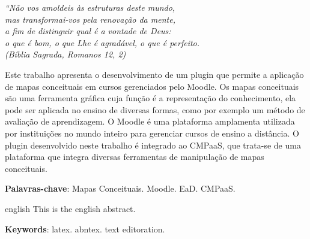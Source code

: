 \documentclass[
	12pt,				%
	openright,			%
	oneside,			%
	a4paper,			%
	english,			%
	french,				%
	spanish,			%
	brazil				%
	]{abntex2}
\begin{document}
\begin{agradecimentos}
\end{agradecimentos}

\begin{epigrafe}
     \vspace*{\fill}
 	\begin{flushright}
 		\textit{``Não vos amoldeis às estruturas deste mundo, \\
 		mas transformai-vos pela renovação da mente, \\
 		a fim de distinguir qual é a vontade de Deus: \\
 		o que é bom, o que Lhe é agradável, o que é perfeito.\\
 		(Bíblia Sagrada, Romanos 12, 2)}
 	\end{flushright}
 \end{epigrafe}


\setlength{\absparsep}{18pt} %
\begin{resumo}
 Este trabalho apresenta o desenvolvimento de um plugin que permite a aplicação de mapas conceituais em cursos gerenciados pelo Moodle. Os mapas conceituais são uma ferramenta gráfica cuja função é a representação do conhecimento, ela pode ser aplicada no ensino de diversas formas, como por exemplo um método de avaliação de aprendizagem. O Moodle é uma plataforma amplamenta utilizada por instituições no mundo inteiro para gerenciar cursos de ensino a distância. O plugin desenvolvido neste trabalho é integrado ao CMPaaS, que trata-se de uma plataforma que integra diversas ferramentas de manipulação de mapas conceituais.

 \textbf{Palavras-chave}: Mapas Conceituais. Moodle. EaD. CMPaaS.
\end{resumo}

\begin{resumo}[Abstract]
  \begin{otherlanguage*}{english}
    This is the english abstract.
 
    \vspace{\onelineskip}
 
    \noindent 
    \textbf{Keywords}: latex. abntex. text editoration.
  \end{otherlanguage*}
\end{resumo}


\listoffigures*
\cleardoublepage
\end{document}
